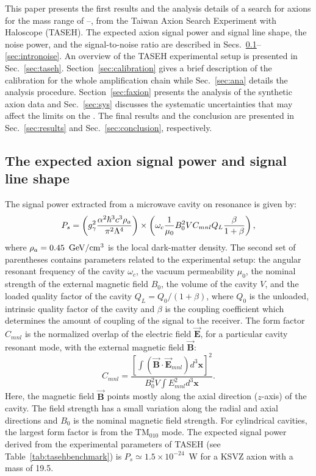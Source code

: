 This paper presents the first results and the analysis 
details of a search for axions for the mass range of \mlo--\mhi\muevcc, 
from the Taiwan Axion Search Experiment with Haloscope (TASEH). 
The expected axion signal power and signal line shape, the noise power, 
and the signal-to-noise ratio are described in 
Secs.~\ref{sec:introsignal}--\ref{sec:intronoise}. An overview 
of the TASEH experimental setup is presented in Sec.~\ref{sec:taseh}. 
Section~\ref{sec:calibration} gives a brief 
description of the calibration for the whole amplification chain 
while Sec.~\ref{sec:ana} details the analysis procedure.  
Section~\ref{sec:faxion} presents the analysis of the 
synthetic axion 
data and Sec.~\ref{sec:sys} discusses the systematic 
uncertainties that may affect the limits on the \gagg. 
The final results and the conclusion are presented in 
Sec.~\ref{sec:results} and Sec.~\ref{sec:conclusion}, 
respectively. 


\subsection{The expected axion signal power and signal line shape}
\label{sec:introsignal}

The signal power extracted from a microwave cavity on resonance is given 
by:
\begin{equation}
P_s = \left(g_{\gamma}^2\frac{\alpha^2\hbar^3c^3\rho_a}{\pi^2\Lambda^4}\right)\times
\left(\omega_c\frac{1}{\mu_0}B_0^2VC_{mnl}Q_L\frac{\beta}{1+\beta}\right),
\label{eq:ps}
\end{equation}
where $\rho_a=0.45~\,\text{Ge\hspace{-.08em}V}/\mathrm{cm}^3$ is the local dark-matter density. 
The second set of parentheses contains parameters related to the experimental 
setup: the angular resonant frequency of the cavity $\omega_c$, 
the vacuum permeability $\mu_0$, the nominal strength of the external magnetic 
field $B_0$, the volume of the cavity $V$, and the loaded quality factor of the 
cavity 
\(Q_L=Q_0/(1+\beta)\), where $Q_0$ is the unloaded, intrinsic quality factor 
of the cavity and $\beta$ is the coupling coefficient which determines the amount 
of coupling of the signal to the receiver. The form factor $C_{mnl}$ is the 
normalized overlap of the electric field 
$\vec{\bm{E}}$, for a particular cavity resonant mode, with the external magnetic 
field $\vec{\bm{B}}$:
\begin{equation}
  C_{mnl} = \frac{\left[\int\left( \vec{\bm{B}}\cdot\vec{\bm{E}}_{mnl}\right) d^3\bm{x}\right]^2}{B_0^2V\int E_{mnl}^2 d^3\bm{x}}.
\label{eq:formfactor} 
\end{equation} 
Here, the magnetic field $\vec{\bm{B}}$ points mostly along the axial 
direction ($z$-axis) of the cavity. 
The field strength has a small variation along the radial and axial directions and 
$B_0$ is the nominal magnetic field strength. 
For cylindrical cavities, the largest form factor is from the 
TM$_{010}$ mode. The expected signal power derived from the experimental 
parameters of TASEH (see Table~\ref{tab:tasehbenchmark}) 
is $P_s\simeq 1.5\times10^{-24}$~W for a KSVZ axion with a 
mass of 19.5\muevcc. 

